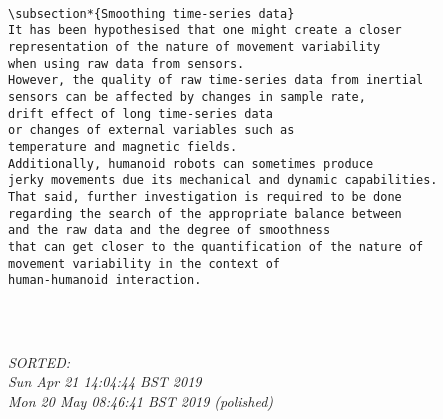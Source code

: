 \documentclass[12pt]{article}
\begin{document}
\begin{enumerate}
%
%


	\begin{verbatim}

\subsection*{Smoothing time-series data}
It has been hypothesised that one might create a closer 
representation of the nature of movement variability 
when using raw data from sensors.
However, the quality of raw time-series data from inertial
sensors can be affected by changes in sample rate, 
drift effect of long time-series data 
or changes of external variables such as 
temperature and magnetic fields.
Additionally, humanoid robots can sometimes produce
jerky movements due its mechanical and dynamic capabilities.
That said, further investigation is required to be done
regarding the search of the appropriate balance between 
and the raw data and the degree of smoothness 
that can get closer to the quantification of the nature of 
movement variability in the context of 
human-humanoid interaction. 


	
	\end{verbatim}
	\textit{
	SORTED:  \\
	Sun Apr 21 14:04:44 BST 2019 \\
	Mon 20 May 08:46:41 BST 2019 (polished)
	}
	\\


\end{enumerate}
\end{document}
